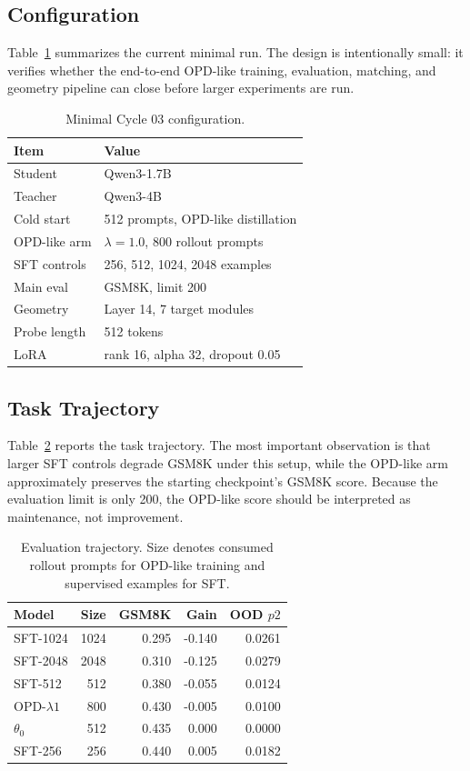 \documentclass[letterpaper]{article}
\begin{document}
\subsection{Configuration}

Table~\ref{tab:config} summarizes the current minimal run.
The design is intentionally small: it verifies whether the end-to-end OPD-like training, evaluation, matching, and geometry pipeline can close before larger experiments are run.

\begin{table}[t]
\centering
\small
\begin{tabular}{ll}
\toprule
Item & Value \\
\midrule
Student & Qwen3-1.7B \\
Teacher & Qwen3-4B \\
Cold start & 512 prompts, OPD-like distillation \\
OPD-like arm & $\lambda=1.0$, 800 rollout prompts \\
SFT controls & 256, 512, 1024, 2048 examples \\
Main eval & GSM8K, limit 200 \\
Geometry & Layer 14, 7 target modules \\
Probe length & 512 tokens \\
LoRA & rank 16, alpha 32, dropout 0.05 \\
\bottomrule
\end{tabular}
\caption{Minimal Cycle 03 configuration.}
\label{tab:config}
\end{table}

\subsection{Task Trajectory}

Table~\ref{tab:trajectory} reports the task trajectory.
The most important observation is that larger SFT controls degrade GSM8K under this setup, while the OPD-like arm approximately preserves the starting checkpoint's GSM8K score.
Because the evaluation limit is only 200, the OPD-like score should be interpreted as maintenance, not improvement.

\begin{table}[t]
\centering
\small
\begin{tabular}{lrrrr}
\toprule
Model & Size & GSM8K & Gain & OOD $p2$ \\
\midrule
SFT-1024 & 1024 & 0.295 & -0.140 & 0.0261 \\
SFT-2048 & 2048 & 0.310 & -0.125 & 0.0279 \\
SFT-512 & 512 & 0.380 & -0.055 & 0.0124 \\
OPD-$\lambda1$ & 800 & 0.430 & -0.005 & 0.0100 \\
$\theta_0$ & 512 & 0.435 & 0.000 & 0.0000 \\
SFT-256 & 256 & 0.440 & 0.005 & 0.0182 \\
\bottomrule
\end{tabular}
\caption{Evaluation trajectory. Size denotes consumed rollout prompts for OPD-like training and supervised examples for SFT.}
\label{tab:trajectory}
\end{table}
\end{document}
